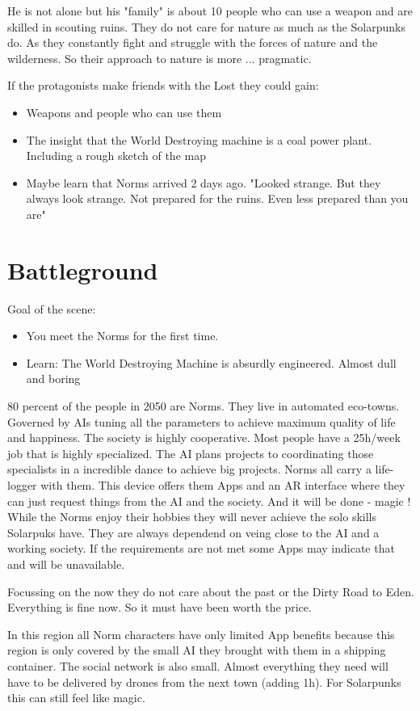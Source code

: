 He is not alone but his "family" is about 10 people who can use a weapon and are skilled in scouting ruins. They do not care for nature as much as the Solarpunks do. As they constantly fight and struggle with the forces of nature and the wilderness. So their approach to nature is more ... pragmatic.

If the protagonists make friends with the Lost they could gain:

\begin{itemize}
    \item Weapons and people who can use them
    \item The insight that the World Destroying machine is a coal power plant. Including a rough sketch of the map
    \item Maybe learn that Norms arrived 2 days ago. "Looked strange. But they always look strange. Not prepared for the ruins. Even less prepared than you are"
\end{itemize}

\section{Battleground}

Goal of the scene:

\begin{itemize}
\item You meet the Norms for the first time.
\item Learn: The World Destroying Machine is absurdly engineered. Almost dull and boring
\end{itemize}

\begin{sidebarBox}[title=Norms]

80 percent of the people in 2050 are Norms. They live in automated eco-towns. Governed by AIs tuning all the parameters to achieve maximum quality of life and happiness. The society is highly cooperative. Most people have a 25h/week job that is highly specialized. The AI plans projects to coordinating those specialists in a incredible dance to achieve big projects.
Norms all carry a life-logger with them. This device offers them Apps and an AR interface where they can just request things from the AI and the society. And it will be done - magic !
While the Norms enjoy their hobbies they will never achieve the solo skills Solarpuks have. They are always dependend on veing close to the AI and a working society. If the requirements are not met some Apps may indicate that and will be unavailable.

Focussing on the now they do not care about the past or the Dirty Road to Eden. Everything is fine now. So it must have been worth the price.

In this region all Norm characters have only limited App benefits because this region is only covered by the small AI they brought with them in a shipping container. The social network is also small. Almost everything they need will have to be delivered by drones from the next town (adding 1h). For Solarpunks this can still feel like magic.

\end{sidebarBox}

